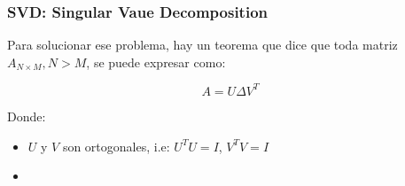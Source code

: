 \subsubsection{SVD: Singular Vaue Decomposition}
 Para solucionar ese problema, hay un teorema que dice que toda matriz $A_{N\times M}, N > M$, se puede expresar como:

 \begin{equation*}
   A = U\Delta V^T
 \end{equation*}

 Donde:

 \begin{itemize}
   \item $U$ y $V$ son ortogonales, i.e: $U^TU = I$, $V^TV = I$
   \item
 \end{itemize}

